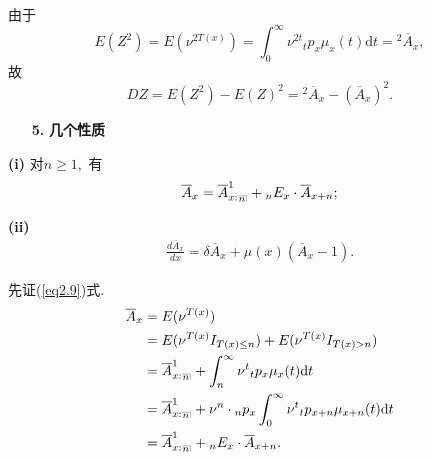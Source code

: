 \documentclass[a4paper,openany, 10pt]{ctexbook}
\makeatletter
\newcommand{\hei}{\CJKfamily{hei}}      %
\DeclareRobustCommand{\annu}[1]{_{%
    \def\arraystretch{0}%
    \setlength\arraycolsep{1pt}%
    \setlength\arrayrulewidth{.2pt}%
    \begin{array}[b]{@{}c|}\hline
        \\[\arraycolsep]%
        \scriptstyle #1%
    \end{array}%
}}
\makeatother
\begin{document}
由于$$E(Z^2) = E(\nu^{2T(x)})=\int_0^\infty \nu^{2t}{}_tp_x\mu_x(t)\mathrm{d}t = {}^2\overline{A}_x,$$ 故
$$
    DZ = E(Z^2) - E(Z)^2 = {}^2\overline{A}_x - (\overline{A}_x)^2.
$$

\begin{itemize}
    \item[{\bf\hei 5.}]{\bf\hei 几个性质 }
\end{itemize}

{\rm\bf(i)} 对$n\ge1,$ 有\begin{align}\label{eq2.9}
    \overline{A}_x = \overline{A}_{x:}^1{}_{\annu{n}} + {}_nE_{x}\cdot \overline{A}_{x+n};\end{align}

{\rm\bf(ii)} \begin{align}\label{eq2.10}
    \frac{d\overline{A}_x}{dx} = \delta \overline{A}_x + \mu(x)(\overline{A}_x - 1).\end{align}

\proof 先证(\ref{eq2.9})式.
\begin{align*}
    \overline{A}_x & = E(\nu^{T(x)})                                                                                           \\
                   & = E(\nu^{T(x)}I_{T(x)\leq n}) + E(\nu^{T(x)}I_{T(x)> n})                                                    \\
                   & = \overline{A}_{x:}^1{}_{\annu{n}} + \int_n^\infty \nu^t{}_tp_x\mu_x(t)\mathrm{d}t                             \\
                   & = \overline{A}_{x:}^1{}_{\annu{n}} + \nu^n\cdot {}_np_x\int_0^\infty \nu^{t}{}_{t}p_{x+n}\mu_{x+n}(t)\mathrm{d}t \\
                   & = \overline{A}_{x:}^1{}_{\annu{n}} + {}_nE_{x}\cdot \overline{A}_{x+n}.
\end{align*}
\end{document}
